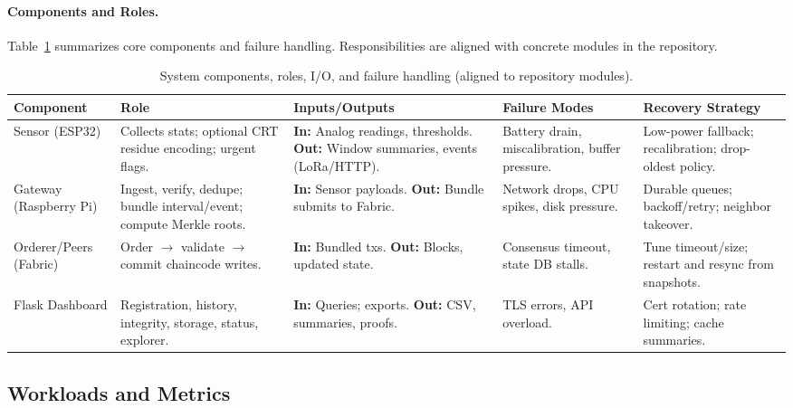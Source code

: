 \documentclass[12pt,onecolumn]{IEEEtran} %
\begin{document}
\paragraph{Components and Roles.}
Table~\ref{tab:components} summarizes core components and failure handling. Responsibilities are aligned with concrete modules in the repository.

\begin{table}[htbp]
  \centering
  \caption{System components, roles, I/O, and failure handling (aligned to repository modules).}
  \label{tab:components}
  \small
  \begin{tabularx}{\textwidth}{l>{\raggedright\arraybackslash}X>{\raggedright\arraybackslash}X>{\raggedright\arraybackslash}X>{\raggedright\arraybackslash}X}
    \toprule
    \textbf{Component} & \textbf{Role} & \textbf{Inputs/Outputs} & \textbf{Failure Modes} & \textbf{Recovery Strategy} \\
    \midrule
    Sensor (ESP32) & Collects stats; optional CRT residue encoding; urgent flags. & \textbf{In:} Analog readings, thresholds. \textbf{Out:} Window summaries, events (LoRa/HTTP). & Battery drain, miscalibration, buffer pressure. & Low-power fallback; recalibration; drop-oldest policy. \\
    \addlinespace
    Gateway (Raspberry Pi) & Ingest, verify, dedupe; bundle interval/event; compute Merkle roots. & \textbf{In:} Sensor payloads. \textbf{Out:} Bundle submits to Fabric. & Network drops, CPU spikes, disk pressure. & Durable queues; backoff/retry; neighbor takeover. \\
    \addlinespace
    Orderer/Peers (Fabric) & Order $\to$ validate $\to$ commit chaincode writes. & \textbf{In:} Bundled txs. \textbf{Out:} Blocks, updated state. & Consensus timeout, state DB stalls. & Tune timeout/size; restart and resync from snapshots. \\
    \addlinespace
    Flask Dashboard & Registration, history, integrity, storage, status, explorer. & \textbf{In:} Queries; exports. \textbf{Out:} CSV, summaries, proofs. & TLS errors, API overload. & Cert rotation; rate limiting; cache summaries. \\
    \bottomrule
  \end{tabularx}
\end{table}

\subsection{Workloads and Metrics}
\label{subsec:workloads-metrics}
\end{document}
